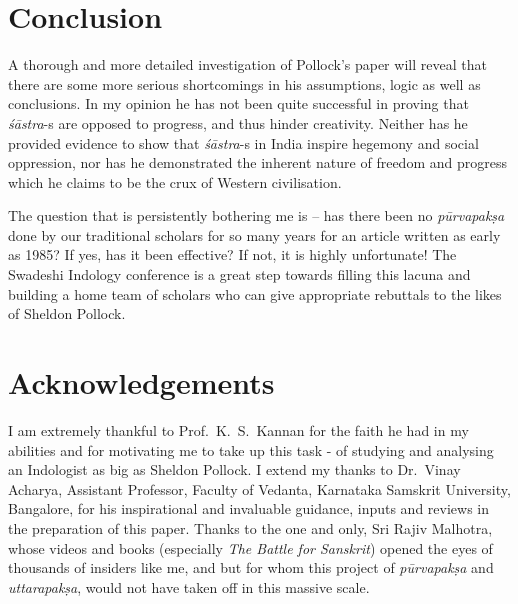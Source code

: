 \section*{Conclusion}

A thorough and more detailed investigation of Pollock's paper will reveal that there are some more serious shortcomings in his assumptions, logic as well as conclusions. In my opinion he has not been quite successful in proving that {\it śāstra}-s are opposed to progress, and thus hinder creativity. Neither has he provided evidence to show that {\it śāstra}-s in India inspire hegemony and social oppression, nor has he demonstrated the inherent nature of freedom and progress which he claims to be the crux of Western civilisation.

The question that is persistently bothering me is -- has there been no {\it pūrvapakṣa} done by our traditional scholars for so many years for an article written as early as 1985? If yes, has it been effective? If not, it is highly unfortunate! The Swadeshi Indology conference is a great step towards filling this lacuna and building a home team of scholars who can give appropriate rebuttals to the likes of Sheldon Pollock.

\section*{Acknowledgements}

I am extremely thankful to Prof.~K.~S.~Kannan for the faith he had in my abilities and for motivating me to take up this task - of studying and analysing an Indologist as big as Sheldon Pollock. I extend my thanks to Dr.~Vinay Acharya, Assistant Professor, Faculty of Vedanta, Karnataka Samskrit University, Bangalore, for his inspirational and invaluable guidance, inputs and reviews in the preparation of this paper. Thanks to the one and only, Sri Rajiv Malhotra, whose videos and books (especially \textit{The Battle for Sanskrit}) opened the eyes of thousands of insiders like me, and but for whom this project of {\it pūrvapakṣa} and {\it uttarapakṣa}, would not have taken off in this massive scale.

